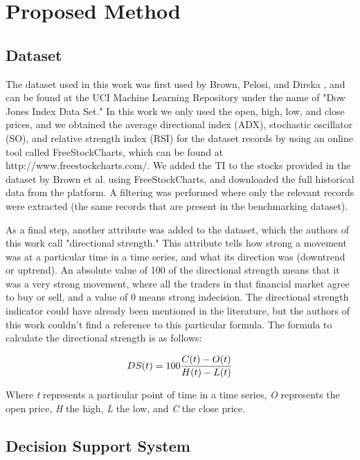 \section{Proposed Method}
\label{proposed-method}

\subsection{Dataset}
\label{dataset}

The dataset used in this work was first used by Brown, Pelosi, and Dirska \cite{brown2013dynamic}, and can be found at the UCI Machine Learning Repository under the name of "Dow Jones Index Data Set." In this work we only used the open, high, low, and close prices, and we obtained the average directional index (ADX), stochastic oscillator (SO), and relative strength index (RSI) for the dataset records by using an online tool called FreeStockCharts, which can be found at http://www.freestockcharts.com/. We added the TI to the stocks provided in the dataset by Brown et al. using FreeStockCharts, and downloaded the full historical data from the platform. A filtering was performed where only the relevant records were extracted (the same records that are present in the benchmarking dataset).

As a final step, another attribute was added to the dataset, which the authors of this work call "directional strength." This attribute tells how strong a movement was at a particular time in a time series, and what its direction was (downtrend or uptrend). An absolute value of 100 of the directional strength means that it was a very strong movement, where all the traders in that financial market agree to buy or sell, and a value of 0 means strong indecision. The directional strength indicator could have already been mentioned in the literature, but the authors of this work couldn't find a reference to this particular formula. The formula to calculate the directional strength is as follows:

\begin{equation} \label{directional-strength}
  DS(t) = 100{{C(t) - O(t)} \over {H(t) - L(t)}}
\end{equation}

Where \textit{t} represents a particular point of time in a time series, \textit{O} represents the open price, \textit{H} the high, \textit{L} the low, and \textit{C} the close price.

\subsection{Decision Support System}

